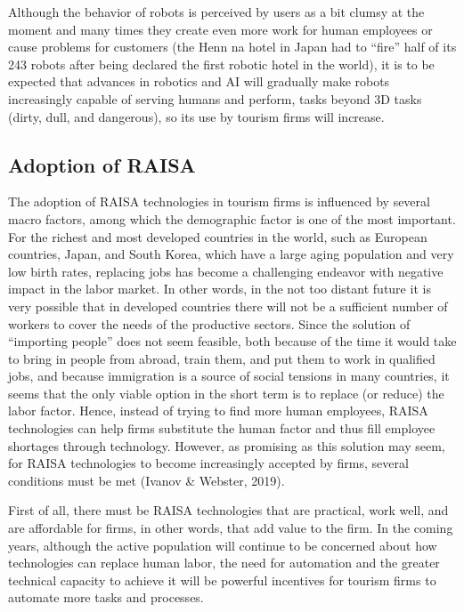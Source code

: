 \documentclass[
  letterpaper,
  DIV=11,
  numbers=noendperiod]{scrreprt}
\begin{document}
Although the behavior of robots is perceived by users as a bit clumsy at
the moment and many times they create even more work for human employees
or cause problems for customers (the Henn na hotel in Japan had to
``fire'' half of its 243 robots after being declared the first robotic
hotel in the world), it is to be expected that advances in robotics and
AI will gradually make robots increasingly capable of serving humans and
perform, tasks beyond 3D tasks (dirty, dull, and dangerous), so its use
by tourism firms will increase.

\hypertarget{adoption-of-raisa}{%
\subsection{Adoption of RAISA}\label{adoption-of-raisa}}

The adoption of RAISA technologies in tourism firms is influenced by
several macro factors, among which the demographic factor is one of the
most important. For the richest and most developed countries in the
world, such as European countries, Japan, and South Korea, which have a
large aging population and very low birth rates, replacing jobs has
become a challenging endeavor with negative impact in the labor market.
In other words, in the not too distant future it is very possible that
in developed countries there will not be a sufficient number of workers
to cover the needs of the productive sectors. Since the solution of
``importing people'' does not seem feasible, both because of the time it
would take to bring in people from abroad, train them, and put them to
work in qualified jobs, and because immigration is a source of social
tensions in many countries, it seems that the only viable option in the
short term is to replace (or reduce) the labor factor. Hence, instead of
trying to find more human employees, RAISA technologies can help firms
substitute the human factor and thus fill employee shortages through
technology. However, as promising as this solution may seem, for RAISA
technologies to become increasingly accepted by firms, several
conditions must be met (Ivanov \& Webster, 2019).

First of all, there must be RAISA technologies that are practical, work
well, and are affordable for firms, in other words, that add value to
the firm. In the coming years, although the active population will
continue to be concerned about how technologies can replace human labor,
the need for automation and the greater technical capacity to achieve it
will be powerful incentives for tourism firms to automate more tasks and
processes.
\end{document}

